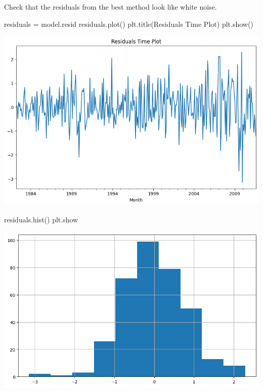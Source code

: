 \documentclass[
  11pt,
]{article}
\newenvironment{Shaded}{\begin{snugshade}}{\end{snugshade}}
\newcommand{\NormalTok}[1]{\textcolor[rgb]{0.00,0.23,0.31}{#1}}
\newcommand{\OperatorTok}[1]{\textcolor[rgb]{0.37,0.37,0.37}{#1}}
\newcommand{\StringTok}[1]{\textcolor[rgb]{0.13,0.47,0.30}{#1}}
\begin{document}
Check that the residuals from the best method look like white noise.

\begin{Shaded}
\begin{Highlighting}[]
\NormalTok{residuals }\OperatorTok{=}\NormalTok{ model.resid}
\NormalTok{residuals.plot()}
\NormalTok{plt.title(}\StringTok{\textquotesingle{}Residuals Time Plot\textquotesingle{}}\NormalTok{)}
\NormalTok{plt.show()}
\end{Highlighting}
\end{Shaded}

\includegraphics{hw5_files/figure-pdf/cell-52-output-1.png}

\begin{Shaded}
\begin{Highlighting}[]
\NormalTok{residuals.hist()}
\NormalTok{plt.show}
\end{Highlighting}
\end{Shaded}

\includegraphics{hw5_files/figure-pdf/cell-53-output-1.png}
\end{document}
